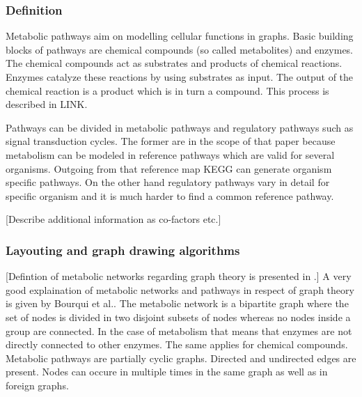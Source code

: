 \subsubsection{Definition}

Metabolic pathways aim on modelling cellular functions in graphs. Basic building blocks of pathways are chemical compounds (so called metabolites) and enzymes. The chemical compounds act as substrates and products of chemical reactions. Enzymes catalyze these reactions by using substrates as input. The output of the chemical reaction is a product which is in turn a compound. This process is described in LINK. 

Pathways can be divided in metabolic pathways and regulatory pathways such as signal transduction cycles. The former are in the scope of that paper because metabolism can be modeled in reference pathways which are valid for several organisms\citep{Kanehisa2000}. Outgoing from that reference map KEGG can generate organism specific pathways. On the other hand regulatory pathways vary in detail for specific organism and it is much harder to find a common reference pathway\citep{Kanehisa2000}.

[Describe additional information as co-factors etc.]

\subsubsection{Layouting and graph drawing algorithms}

[Defintion of metabolic networks regarding graph theory is presented in \citep{Bourqui2006}.]
A very good explaination of metabolic networks and pathways in respect of graph theory is given by Bourqui et al.\citep{Bourqui2006}.
The metabolic network is a bipartite graph where the set of nodes is divided in two disjoint subsets of nodes whereas no nodes inside a group are connected. In the case of metabolism that means that enzymes are not directly connected to other enzymes. The same applies for chemical compounds. 
Metabolic pathways are partially cyclic graphs. Directed and undirected edges are present.
Nodes can occure in multiple times in the same graph as well as in foreign graphs.

